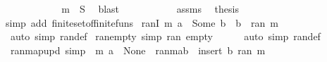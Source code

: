 \begin{isabellebody}
\ \ \ \ \ \ \isamarkupfalse%
\ {}\ {}\ \isamarkupfalse%
\ {\isachardoublequoteopen}m\ {\isasymin}\ {\isacharquery}{\kern0pt}S{\isachardoublequoteclose}\ \isamarkupfalse%
\ blast\isanewline
\ \ \ \ \isamarkupfalse%
\isanewline
\ \ \isamarkupfalse%
\isanewline
\ \ \isamarkupfalse%
\ assms\ \isamarkupfalse%
\ {\isacharquery}{\kern0pt}thesis\ \isamarkupfalse%
{\isacharparenleft}{\kern0pt}simp\ add{\isacharcolon}{\kern0pt}\ finite{\isacharunderscore}{\kern0pt}set{\isacharunderscore}{\kern0pt}of{\isacharunderscore}{\kern0pt}finite{\isacharunderscore}{\kern0pt}funs{\isacharparenright}{\kern0pt}\isanewline
{}\isamarkupfalse%
%
\endisatagproof
{\isafoldproof}%
%
\isadelimproof
%
\endisadelimproof
%
\isadelimdocument
%
\endisadelimdocument
%
\isatagdocument
%
\isamarkuptrue%
%
\endisatagdocument
{\isafolddocument}%
%
\isadelimdocument
%
\endisadelimdocument
{}\isamarkupfalse%
\ ranI{\isacharcolon}{\kern0pt}\ {\isachardoublequoteopen}m\ a\ {\isacharequal}{\kern0pt}\ Some\ b\ {\isasymLongrightarrow}\ b\ {\isasymin}\ ran\ m{\isachardoublequoteclose}\isanewline
%
\isadelimproof
\ \ %
\endisadelimproof
%
\isatagproof
{}\isamarkupfalse%
\ {\isacharparenleft}{\kern0pt}auto\ simp{\isacharcolon}{\kern0pt}\ ran{\isacharunderscore}{\kern0pt}def{\isacharparenright}{\kern0pt}%
\endisatagproof
{\isafoldproof}%
%
\isadelimproof
\isanewline
%
\endisadelimproof
\isanewline
\isanewline
{}\isamarkupfalse%
\ ran{\isacharunderscore}{\kern0pt}empty\ {\isacharbrackleft}{\kern0pt}simp{\isacharbrackright}{\kern0pt}{\isacharcolon}{\kern0pt}\ {\isachardoublequoteopen}ran\ empty\ {\isacharequal}{\kern0pt}\ {\isacharbraceleft}{\kern0pt}{\isacharbraceright}{\kern0pt}{\isachardoublequoteclose}\isanewline
%
\isadelimproof
\ \ %
\endisadelimproof
%
\isatagproof
{}\isamarkupfalse%
\ {\isacharparenleft}{\kern0pt}auto\ simp{\isacharcolon}{\kern0pt}\ ran{\isacharunderscore}{\kern0pt}def{\isacharparenright}{\kern0pt}%
\endisatagproof
{\isafoldproof}%
%
\isadelimproof
\isanewline
%
\endisadelimproof
\isanewline
{}\isamarkupfalse%
\ ran{\isacharunderscore}{\kern0pt}map{\isacharunderscore}{\kern0pt}upd\ {\isacharbrackleft}{\kern0pt}simp{\isacharbrackright}{\kern0pt}{\isacharcolon}{\kern0pt}\ \ {\isachardoublequoteopen}m\ a\ {\isacharequal}{\kern0pt}\ None\ {\isasymLongrightarrow}\ ran{\isacharparenleft}{\kern0pt}m{\isacharparenleft}{\kern0pt}a{\isasymmapsto}b{\isacharparenright}{\kern0pt}{\isacharparenright}{\kern0pt}\ {\isacharequal}{\kern0pt}\ insert\ b\ {\isacharparenleft}{\kern0pt}ran\ m{\isacharparenright}{\kern0pt}{\isachardoublequoteclose}\isanewline

\end{isabellebody}
